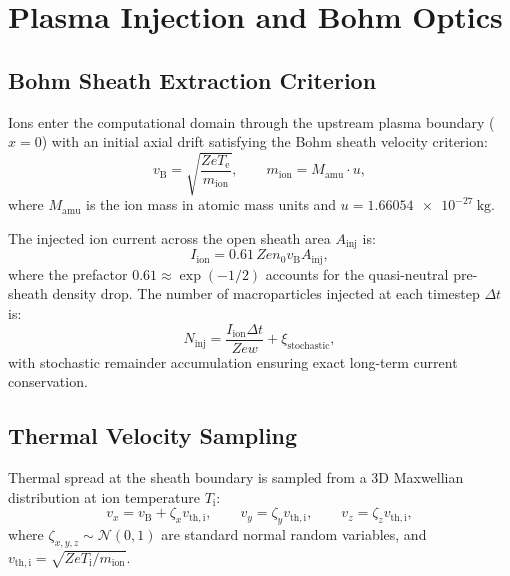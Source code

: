 \documentclass[11pt,a4paper]{article}
\begin{document}
\section{Plasma Injection and Bohm Optics}

\subsection{Bohm Sheath Extraction Criterion}

Ions enter the computational domain through the upstream plasma boundary ($x = 0$) with an initial axial drift satisfying the Bohm sheath velocity criterion:
\begin{equation}
    v_{\mathrm{B}} = \sqrt{\frac{Z e T_{\mathrm{e}}}{m_{\mathrm{ion}}}}, \qquad
    m_{\mathrm{ion}} = M_{\mathrm{amu}} \cdot u,
    \label{eq:bohm}
\end{equation}
where $M_{\mathrm{amu}}$ is the ion mass in atomic mass units and $u = \SI{1.66054e-27}{\kilo\gram}$.

The injected ion current across the open sheath area $A_{\mathrm{inj}}$ is:
\begin{equation}
    I_{\mathrm{ion}} = 0.61\, Z e n_{0} v_{\mathrm{B}} A_{\mathrm{inj}},
\end{equation}
where the prefactor $0.61 \approx \exp(-1/2)$ accounts for the quasi-neutral pre-sheath density drop. The number of macroparticles injected at each timestep $\Delta t$ is:
\begin{equation}
    N_{\mathrm{inj}} = \frac{I_{\mathrm{ion}} \Delta t}{Z e w} + \xi_{\mathrm{stochastic}},
\end{equation}
with stochastic remainder accumulation ensuring exact long-term current conservation.

\subsection{Thermal Velocity Sampling}

Thermal spread at the sheath boundary is sampled from a 3D Maxwellian distribution at ion temperature $T_{\mathrm{i}}$:
\begin{equation}
    v_x = v_{\mathrm{B}} + \zeta_x v_{\mathrm{th,i}}, \qquad
    v_y = \zeta_y v_{\mathrm{th,i}}, \qquad
    v_z = \zeta_z v_{\mathrm{th,i}},
\end{equation}
where $\zeta_{x,y,z} \sim \mathcal{N}(0, 1)$ are standard normal random variables, and $v_{\mathrm{th,i}} = \sqrt{Z e T_{\mathrm{i}} / m_{\mathrm{ion}}}$.
\end{document}
